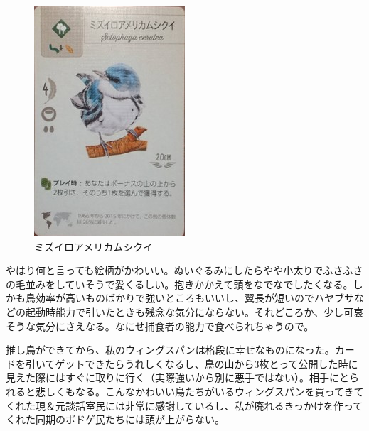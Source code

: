 \begin{figure}[h]
\begin{minipage}[b]{0.23\columnwidth}
  \includegraphics[width=0.9\columnwidth]{2025shinki/wing_span/mizuiroamerikamusikui.jpg}
  \caption{ミズイロアメリカムシクイ}
  \label{fig:ミズイロアメリカムシクイ}
\end{minipage}
\end{figure}
\begin{multicols}{2}
\par
やはり何と言っても絵柄がかわいい。ぬいぐるみにしたらやや小太りでふさふさの毛並みをしていそうで愛くるしい。抱きかかえて頭をなでなでしたくなる。しかも鳥効率が高いものばかりで強いところもいいし、翼長が短いのでハヤブサなどの起動時能力で引いたときも残念な気分にならない。それどころか、少し可哀そうな気分にさえなる。なにせ捕食者の能力で食べられちゃうので。
\par
推し鳥ができてから、私のウィングスパンは格段に幸せなものになった。カードを引いてゲットできたらうれしくなるし、鳥の山から3枚とって公開した時に見えた際にはすぐに取りに行く（実際強いから別に悪手ではない）。相手にとられると悲しくもなる。こんなかわいい鳥たちがいるウィングスパンを買ってきてくれた現＆元談話室民には非常に感謝しているし、私が廃れるきっかけを作ってくれた同期のボドゲ民たちには頭が上がらない。
\end{multicols}